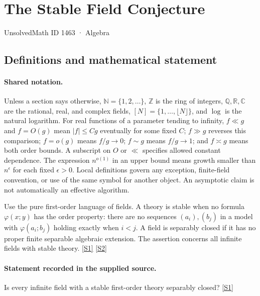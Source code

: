 \documentclass[11pt,a4paper]{article}
\newcommand{\N}{\mathbb{N}}
\newcommand{\Z}{\mathbb{Z}}
\newcommand{\Q}{\mathbb{Q}}
\newcommand{\R}{\mathbb{R}}
\newcommand{\C}{\mathbb{C}}
\newcommand{\sref}[2]{\hyperlink{source:#1:#2}{[S#2]}}
\begin{document}

\setcounter{section}{1462}

\section{The Stable Field Conjecture}\label{1463}

{\small\sffamily UnsolvedMath ID 1463 · Algebra}

\subsection{Definitions and mathematical statement}

\paragraph{Shared notation.}Unless a section says otherwise, $\N=\{1,2,\ldots\}$,
$\Z$ is the ring of integers, $\Q,\R,\C$ are the rational, real, and complex
fields, $[N]=\{1,\ldots,\lfloor N\rfloor\}$, and $\log$ is the natural
logarithm. For real functions of a parameter tending to infinity,
$f\ll g$ and $f=O(g)$ mean $|f|\leq Cg$ eventually for some fixed $C$;
$f\gg g$ reverses this comparison; $f=o(g)$ means $f/g\to0$;
$f\sim g$ means $f/g\to1$; and $f\asymp g$ means both order bounds.
A subscript on $O$ or $\ll$ specifies allowed constant dependence.
The expression $n^{o(1)}$ in an upper bound means growth smaller than
$n^\epsilon$ for each fixed $\epsilon>0$. Local definitions govern any
exception, finite-field convention, or use of the same symbol for another
object. An asymptotic claim is not automatically an effective algorithm.



Use the pure first-order language of fields. A theory is stable when no formula $\varphi(x;y)$ has the order property: there are no sequences $(a_i),(b_j)$ in a model with $\varphi(a_i;b_j)$ holding exactly when $i<j$. A field is separably closed if it has no proper finite separable algebraic extension. The assertion concerns all infinite fields with stable theory. \sref{1463}{1} \sref{1463}{2}

\paragraph{Statement recorded in the supplied source.}
Is every infinite field with a stable first-order theory separably closed? \sref{1463}{1}
\end{document}
